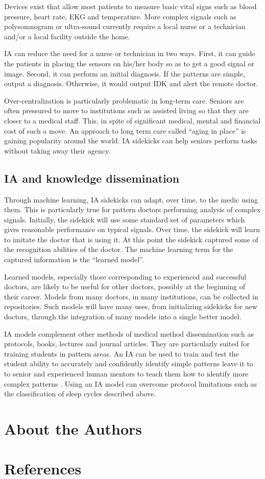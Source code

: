 \documentclass[11pt]{pnas-new}
\begin{document}
Devices exist that allow most patients to measure basic vital signs
such as blood pressure, heart rate, EKG and temperature. More complex signals such as
polysomnogram or ultra-sound currently require a local nurse or a
technician and/or a local facility outside the home.

IA can reduce the need for a nurse or technician in two ways. First,
it can guide the patients in placing the sensors on his/her
body so as to get a good signal or image. Second, it can perform an
initial diagnosis. If the patterns are simple, output a diagnosis.
Otherwise, it would output IDK and alert the remote doctor.

Over-centralization is particularly problematic in long-term care.
Seniors are often pressured to move to institutions such as
assisted living so that they are closer to a medical staff. This, in
spite of significant medical, mental and financial cost of such a
move. An approach to long term care called ``aging in
place'' is gaining popularity around the world. IA sidekicks can help
seniors perform tasks without taking away their agency.


\subsection{IA and knowledge dissemination}

Through machine learning, IA sidekicks can adapt, over time, to the
medic using them. This is particularly true for pattern doctors
performing analysis of complex signals. Initially, the sidekick will
use some standard set of parameters which gives reasonable performance on
typical signals. Over time, the sidekick will learn to imitate the
doctor that is using it. At this point the sidekick captured some of
the recognition abilities of the doctor. The machine learning term for
the captured information is the ``learned model''.

Learned models, especially those corresponding to experienced and
successful doctors, are likely to be useful for other doctors,
possibly at the beginning of their career. Models from many doctors,
in many institutions, can be collected in repositories. Such models
will have many uses, from initializing sidekicks for new doctors,
through the integration of many models into a single better model.

IA models complement other methods of medical method dissemination
such as protocols, books, lectures and journal articles. They are
particularly suited for training students in pattern areas. An IA can
be used to train and test the student ability to accurately and
confidently identify simple patterns leave it to to senior and
experienced human mentors to teach them how to identify more complex
patterns \cite{reid2000medical}.
Using an IA model can overcome protocol limitations such as
the classification of sleep cycles described above.

\section{About the Authors}


\section{References}
%  

\end{document}
